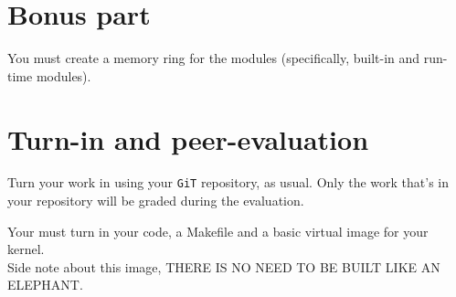 \documentclass{42-en}
\begin{document}
\chapter{Bonus part}
    You must create a memory ring for the modules (specifically, built-in and
    run-time modules).

\chapter{Turn-in and peer-evaluation}

    Turn your work in using your \texttt{GiT} repository, as
    usual. Only the work that's in your repository will be graded during
    the evaluation.

    Your must turn in your code, a Makefile and a basic virtual image for your
    kernel.\\
    Side note about this image,
    THERE IS NO NEED TO BE BUILT LIKE AN ELEPHANT.

\end{document}
